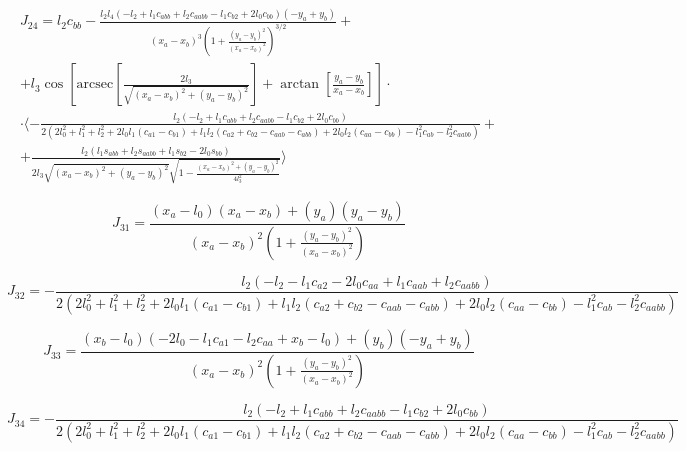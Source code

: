 \documentclass[printmode]{mgr}
\begin{document}
\begin{multline*}
J_{24} = 
 l_2 c_{bb}-\frac{l_2 l_4 (-l_2+l_1 c_{abb}+l_2 c_{aabb}-l_1 c_{b2}+2 l_0 c_{bb}) (-y_a+y_b)}{(x_a - x_b)^3 \left(1+\frac{(y_a - y_b)^2}{(x_a - x_b)^2}\right)^{3/2}}+
 \\
 +l_3 \cos\left[\text{arcsec}\left[\frac{2 l_3}{\sqrt{(x_a - x_b)^2+(y_a - y_b)^2}}\right]+\arctan\left[\frac{y_a - y_b}{x_a - x_b}\right]\right] \cdot
 \\
 \cdot \langle-\frac{l_2 (-l_2+l_1 c_{abb}+l_2 c_{aabb}-l_1 c_{b2}+2 l_0 c_{bb})}{2 \left(2 l_0^2+l_1^2+l_2^2+2 l_0 l_1 (c_{a1}-c_{b1})+l_1 l_2 (c_{a2}+c_{b2}-c_{aab}-c_{abb})+2 l_0 l_2 (c_{aa}-c_{bb})-l_1^2 c_{ab}-l_2^2 c_{aabb}\right)}+
 \\
 +\frac{l_2 (l_1 s_{abb}+l_2 s_{aabb}+l_1 s_{b2}-2 l_0 s_{bb})}{2 l_3 \sqrt{(x_a - x_b)^2+(y_a - y_b)^2} \sqrt{1-\frac{(x_a - x_b)^2+(y_a - y_b)^2}{4 l_3^2}}}\rangle
\end{multline*}

\begin{equation*}
J_{31} = 
 \frac{(x_a - l_0) (x_a - x_b)+(y_a) (y_a - y_b)}{(x_a - x_b)^2 \left(1+\frac{(y_a - y_b)^2}{(x_a - x_b)^2}\right)} 
\end{equation*}

\begin{equation*}
J_{32} = 
 -\frac{l_2 (-l_2-l_1 c_{a2}-2 l_0 c_{aa}+l_1 c_{aab}+l_2 c_{aabb})}{2 \left(2 l_0^2+l_1^2+l_2^2+2 l_0 l_1 (c_{a1}-c_{b1})+l_1 l_2 (c_{a2}+c_{b2}-c_{aab}-c_{abb})+2 l_0 l_2 (c_{aa}-c_{bb})-l_1^2 c_{ab}-l_2^2 c_{aabb}\right)} 
\end{equation*}

\begin{equation*}
J_{33} = 
 \frac{(x_b - l_0) (-2 l_0-l_1 c_{a1}-l_2 c_{aa}+x_b - l_0)+(y_b) (-y_a+y_b)}{(x_a - x_b)^2 \left(1+\frac{(y_a - y_b)^2}{(x_a - x_b)^2}\right)} 
\end{equation*}

\begin{equation*}
J_{34} = 
 -\frac{l_2 (-l_2+l_1 c_{abb}+l_2 c_{aabb}-l_1 c_{b2}+2 l_0 c_{bb})}{2 \left(2 l_0^2+l_1^2+l_2^2+2 l_0 l_1 (c_{a1}-c_{b1})+l_1 l_2 (c_{a2}+c_{b2}-c_{aab}-c_{abb})+2 l_0 l_2 (c_{aa}-c_{bb})-l_1^2 c_{ab}-l_2^2 c_{aabb}\right)}
\end{equation*}


\end{document}
